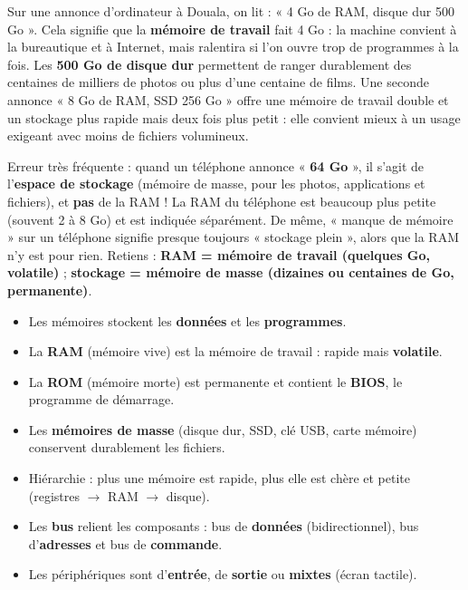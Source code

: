 \documentclass[11pt]{article}
\begin{document}
\begin{exemplebox}
Sur une annonce d'ordinateur à Douala, on lit : « 4 Go de RAM, disque dur 500 Go ». Cela signifie que la \textbf{mémoire de travail} fait 4 Go : la machine convient à la bureautique et à Internet, mais ralentira si l'on ouvre trop de programmes à la fois. Les \textbf{500 Go de disque dur} permettent de ranger durablement des centaines de milliers de photos ou plus d'une centaine de films. Une seconde annonce « 8 Go de RAM, SSD 256 Go » offre une mémoire de travail double et un stockage plus rapide mais deux fois plus petit : elle convient mieux à un usage exigeant avec moins de fichiers volumineux.
\end{exemplebox}

\begin{attention}
Erreur très fréquente : quand un téléphone annonce « \textbf{64 Go} », il s'agit de l'\textbf{espace de stockage} (mémoire de masse, pour les photos, applications et fichiers), et \textbf{pas} de la RAM ! La RAM du téléphone est beaucoup plus petite (souvent 2 à 8 Go) et est indiquée séparément. De même, « manque de mémoire » sur un téléphone signifie presque toujours « stockage plein », alors que la RAM n'y est pour rien. Retiens : \textbf{RAM = mémoire de travail (quelques Go, volatile)} ; \textbf{stockage = mémoire de masse (dizaines ou centaines de Go, permanente)}.
\end{attention}

\begin{aretenir}
\begin{itemize}
  \item Les mémoires stockent les \textbf{données} et les \textbf{programmes}.
  \item La \textbf{RAM} (mémoire vive) est la mémoire de travail : rapide mais \textbf{volatile}.
  \item La \textbf{ROM} (mémoire morte) est permanente et contient le \textbf{BIOS}, le programme de démarrage.
  \item Les \textbf{mémoires de masse} (disque dur, SSD, clé USB, carte mémoire) conservent durablement les fichiers.
  \item Hiérarchie : plus une mémoire est rapide, plus elle est chère et petite (registres $\rightarrow$ RAM $\rightarrow$ disque).
  \item Les \textbf{bus} relient les composants : bus de \textbf{données} (bidirectionnel), bus d'\textbf{adresses} et bus de \textbf{commande}.
  \item Les périphériques sont d'\textbf{entrée}, de \textbf{sortie} ou \textbf{mixtes} (écran tactile).
\end{itemize}
\end{aretenir}
\end{document}
